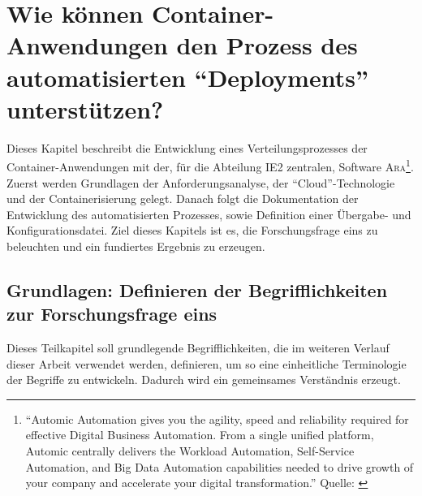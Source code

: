 \chapter[Forschungsfrage 1]{Wie können Container-Anwendungen den Prozess des automatisierten \enquote{Deployments} unterstützen?} \label{ff1}
Dieses Kapitel beschreibt die Entwicklung eines Verteilungsprozesses der Container-Anwendungen mit der, für die Abteilung \ac{IE2} zentralen, Software \textsc{Ara}\footnote{\enquote{Automic Automation gives you the agility, speed and reliability required for effective Digital Business Automation. From a single unified platform, Automic centrally delivers the Workload Automation, Self-Service Automation, and Big Data Automation capabilities needed to drive growth of your company and accelerate your digital transformation.} Quelle: \cite{broadcom_inc_automic_2020}}. Zuerst werden Grundlagen der Anforderungsanalyse, der \enquote{Cloud}-Technologie und der Containerisierung gelegt. Danach folgt die Dokumentation der Entwicklung des automatisierten Prozesses, sowie Definition einer Übergabe- und Konfigurationsdatei. Ziel dieses Kapitels ist es, die Forschungsfrage eins zu beleuchten und ein fundiertes Ergebnis zu erzeugen.

\section{Grundlagen: Definieren der Begrifflichkeiten zur Forschungsfrage eins}
Dieses Teilkapitel soll grundlegende Begrifflichkeiten, die im weiteren Verlauf dieser Arbeit verwendet werden, definieren, um so eine einheitliche Terminologie der Begriffe zu entwickeln. Dadurch wird ein gemeinsames Verständnis erzeugt.

